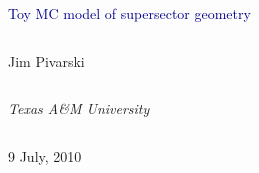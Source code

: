 \documentclass[compress]{beamer}
\begin{document}
\begin{frame}
\vfill
\begin{center}
\textcolor{darkblue}{\Large Toy MC model of supersector geometry}

\vfill
\begin{columns}
\begin{center}
\large
Jim Pivarski
\end{center}
\end{columns}

\begin{columns}
\begin{center}
\scriptsize
{\it Texas A\&M University}
\end{center}
\end{columns}

\vfill
 9 July, 2010

\end{center}
\end{frame}


\small
\end{document}
